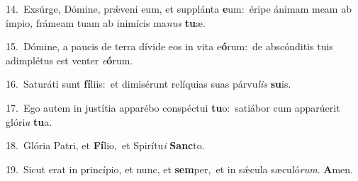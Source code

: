 {\numbfont\textcolor{\numbcolor}{14.}}~Exsúrge, Dómine, prǽveni eum, et supplánta \textbf{e}\-um:~\star éripe ánimam meam ab ímpio, frámeam tuam ab inimícis ma\textit{nus} \textbf{tu}\-æ.\par
{\numbfont\textcolor{\numbcolor}{15.}}~Dómine, a paucis de terra dívide eos in vita e\-\textbf{ó}\-rum:~\star de abscónditis tuis adimplétus est venter \textit{e}\-\textbf{ó}rum.\par
{\numbfont\textcolor{\numbcolor}{16.}}~Saturáti sunt \textbf{fí}\-liis:~\star et dimisérunt relíquias suas párvu\textit{lis} \textbf{su}\-is.\par
{\numbfont\textcolor{\numbcolor}{17.}}~Ego autem in justítia apparébo conspéctui \textbf{tu}\-o:~\star satiábor cum apparúerit glóri\textit{a} \textbf{tu}\-a.\par
{\numbfont\textcolor{\numbcolor}{18.}}~Glória Patri, et \textbf{Fí}\-lio,~\star et Spirítu\textit{i} \textbf{Sanc}\-to.\par
{\numbfont\textcolor{\numbcolor}{19.}}~Sicut erat in princípio, et nunc, et \textbf{sem}\-per,~\star et in sǽcula sæculó\-\textit{rum}\-. \textbf{A}\-men.\par
